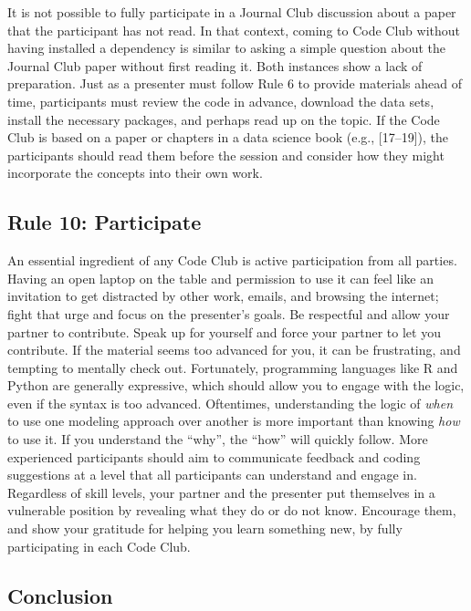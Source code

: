 \documentclass[
  11pt,
]{article}
\begin{document}
It is not possible to fully participate in a Journal Club discussion
about a paper that the participant has not read. In that context, coming
to Code Club without having installed a dependency is similar to asking
a simple question about the Journal Club paper without first reading it.
Both instances show a lack of preparation. Just as a presenter must
follow Rule 6 to provide materials ahead of time, participants must
review the code in advance, download the data sets, install the
necessary packages, and perhaps read up on the topic. If the Code Club
is based on a paper or chapters in a data science book (e.g.,
{[}17--19{]}), the participants should read them before the session and
consider how they might incorporate the concepts into their own work.

\hypertarget{rule-10-participate}{%
\subsection{Rule 10: Participate}\label{rule-10-participate}}

An essential ingredient of any Code Club is active participation from
all parties. Having an open laptop on the table and permission to use it
can feel like an invitation to get distracted by other work, emails, and
browsing the internet; fight that urge and focus on the presenter's
goals. Be respectful and allow your partner to contribute. Speak up for
yourself and force your partner to let you contribute. If the material
seems too advanced for you, it can be frustrating, and tempting to
mentally check out. Fortunately, programming languages like R and Python
are generally expressive, which should allow you to engage with the
logic, even if the syntax is too advanced. Oftentimes, understanding the
logic of \emph{when} to use one modeling approach over another is more
important than knowing \emph{how} to use it. If you understand the
``why'', the ``how'' will quickly follow. More experienced participants
should aim to communicate feedback and coding suggestions at a level
that all participants can understand and engage in. Regardless of skill
levels, your partner and the presenter put themselves in a vulnerable
position by revealing what they do or do not know. Encourage them, and
show your gratitude for helping you learn something new, by fully
participating in each Code Club.

\hypertarget{conclusion}{%
\subsection{Conclusion}\label{conclusion}}
\end{document}
